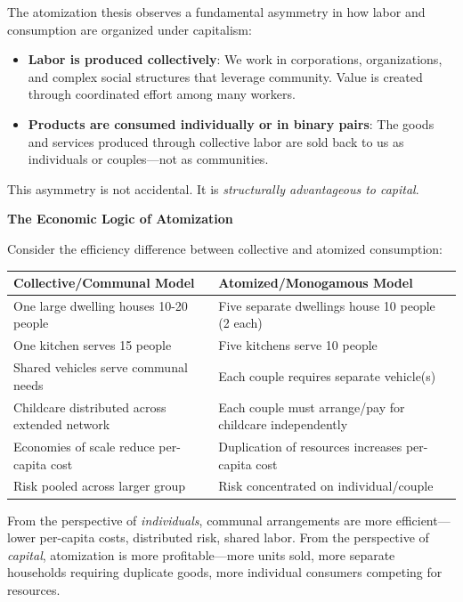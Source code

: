 \documentclass[12pt, letterpaper]{article}
\begin{document}
The atomization thesis observes a fundamental asymmetry in how labor and consumption are organized under capitalism:

\begin{itemize}
    \item \textbf{Labor is produced collectively}: We work in corporations, organizations, and complex social structures that leverage community. Value is created through coordinated effort among many workers.
    
    \item \textbf{Products are consumed individually or in binary pairs}: The goods and services produced through collective labor are sold back to us as individuals or couples---not as communities.
\end{itemize}

This asymmetry is not accidental. It is \textit{structurally advantageous to capital}.

\textbf{The Economic Logic of Atomization}

Consider the efficiency difference between collective and atomized consumption:

\begin{center}
\begin{tabular}{|p{2.5in}|p{2.5in}|}
\hline
\textbf{Collective/Communal Model} & \textbf{Atomized/Monogamous Model} \\
\hline
One large dwelling houses 10-20 people & Five separate dwellings house 10 people (2 each) \\
\hline
One kitchen serves 15 people & Five kitchens serve 10 people \\
\hline
Shared vehicles serve communal needs & Each couple requires separate vehicle(s) \\
\hline
Childcare distributed across extended network & Each couple must arrange/pay for childcare independently \\
\hline
Economies of scale reduce per-capita cost & Duplication of resources increases per-capita cost \\
\hline
Risk pooled across larger group & Risk concentrated on individual/couple \\
\hline
\end{tabular}
\end{center}

From the perspective of \textit{individuals}, communal arrangements are more efficient---lower per-capita costs, distributed risk, shared labor. From the perspective of \textit{capital}, atomization is more profitable---more units sold, more separate households requiring duplicate goods, more individual consumers competing for resources.
\end{document}

